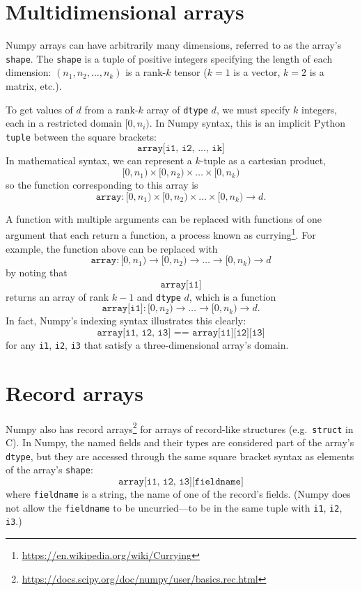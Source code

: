 \documentclass[12pt]{article}
\begin{document}
\section*{Multidimensional arrays}

Numpy arrays can have arbitrarily many dimensions, referred to as the array's \texttt{shape}. The \texttt{shape} is a tuple of positive integers specifying the length of each dimension: $(n_1, n_2, \ldots, n_k)$ is a rank-$k$ tensor ($k = 1$ is a vector, $k = 2$ is a matrix, etc.).

To get values of $d$ from a rank-$k$ array of \texttt{dtype} $d$, we must specify $k$ integers, each in a restricted domain $[0, n_i)$. In Numpy syntax, this is an implicit Python \texttt{tuple} between the square brackets:
\[ \texttt{array[i1, i2, ..., ik]} \]
\noindent In mathematical syntax, we can represent a $k$-tuple as a cartesian product,
\[ [0, n_1) \times [0, n_2) \times \ldots \times [0, n_k) \]
\noindent so the function corresponding to this array is
\[ \texttt{array}: [0, n_1) \times [0, n_2) \times \ldots \times [0, n_k) \to d. \]

A function with multiple arguments can be replaced with functions of one argument that each return a function, a process known as currying\footnote{\url{https://en.wikipedia.org/wiki/Currying}}. For example, the function above can be replaced with
\[ \texttt{array}: [0, n_1) \to [0, n_2) \to \ldots \to [0, n_k) \to d \]
\noindent by noting that
\[ \texttt{array[i1]} \]
\noindent returns an array of rank $k - 1$ and \texttt{dtype} $d$, which is a function
\[ \texttt{array[i1]}: [0, n_2) \to \ldots \to [0, n_k) \to d. \]
\noindent In fact, Numpy's indexing syntax illustrates this clearly:
\[ \texttt{array[i1, i2, i3] == array[i1][i2][i3]} \]
\noindent for any \texttt{i1}, \texttt{i2}, \texttt{i3} that satisfy a three-dimensional array's domain.

\section*{Record arrays}

Numpy also has record arrays\footnote{\url{https://docs.scipy.org/doc/numpy/user/basics.rec.html}} for arrays of record-like structures (e.g.\ \texttt{struct} in C). In Numpy, the named fields and their types are considered part of the array's \texttt{dtype}, but they are accessed through the same square bracket syntax as elements of the array's \texttt{shape}:
\[ \texttt{array[i1, i2, i3][fieldname]} \]
\noindent where \texttt{fieldname} is a string, the name of one of the record's fields. (Numpy does not allow the \texttt{fieldname} to be uncurried---to be in the same tuple with \texttt{i1}, \texttt{i2}, \texttt{i3}.)
\end{document}
